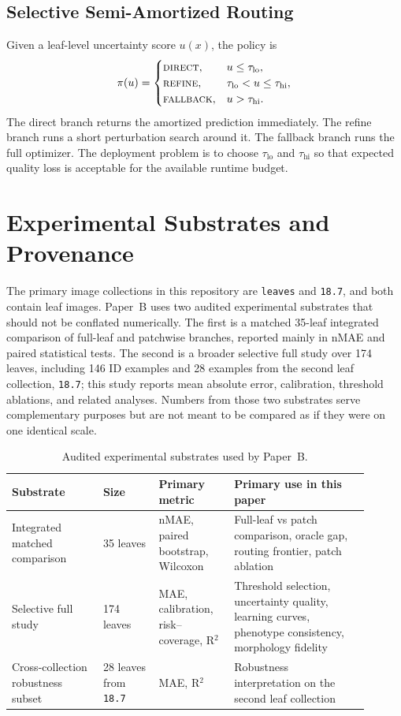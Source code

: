 \documentclass[11pt,a4paper]{article}
\newcommand{\nmae}{nMAE}
\begin{document}
\subsection{Selective Semi-Amortized Routing}
Given a leaf-level uncertainty score $u(x)$, the policy is
\begin{equation}
\pi(u)=
\begin{cases}
\textsc{direct}, & u\le \tau_{\mathrm{lo}},\\
\textsc{refine}, & \tau_{\mathrm{lo}}<u\le \tau_{\mathrm{hi}},\\
\textsc{fallback}, & u>\tau_{\mathrm{hi}}.
\end{cases}
\label{eq:routing}
\end{equation}
The direct branch returns the amortized prediction immediately.
The refine branch runs a short perturbation search around it.
The fallback branch runs the full optimizer.
The deployment problem is to choose $\tau_{\mathrm{lo}}$ and $\tau_{\mathrm{hi}}$ so that expected quality loss is acceptable for the available runtime budget.

\section{Experimental Substrates and Provenance}
The primary image collections in this repository are \texttt{leaves} and \texttt{18.7}, and both contain leaf images.
Paper~B uses two audited experimental substrates that should not be conflated numerically.
The first is a matched 35-leaf integrated comparison of full-leaf and patchwise branches, reported mainly in \nmae{} and paired statistical tests.
The second is a broader selective full study over 174 leaves, including 146 ID examples and 28 examples from the second leaf collection, \texttt{18.7}; this study reports mean absolute error, calibration, threshold ablations, and related analyses.
Numbers from those two substrates serve complementary purposes but are not meant to be compared as if they were on one identical scale.

\begin{table}[H]
\centering
\caption{Audited experimental substrates used by Paper~B.}
\label{tab:substrates}
\small
\begin{tabular}{p{0.23\linewidth}p{0.14\linewidth}p{0.19\linewidth}p{0.34\linewidth}}
\toprule
Substrate & Size & Primary metric & Primary use in this paper \\
\midrule
Integrated matched comparison & 35 leaves & \nmae{}, paired bootstrap, Wilcoxon & Full-leaf vs patch comparison, oracle gap, routing frontier, patch ablation \\
Selective full study & 174 leaves & MAE, calibration, risk--coverage, R$^2$ & Threshold selection, uncertainty quality, learning curves, phenotype consistency, morphology fidelity \\
Cross-collection robustness subset & 28 leaves from \texttt{18.7} & MAE, R$^2$ & Robustness interpretation on the second leaf collection \\
\bottomrule
\end{tabular}
\end{table}
\end{document}
